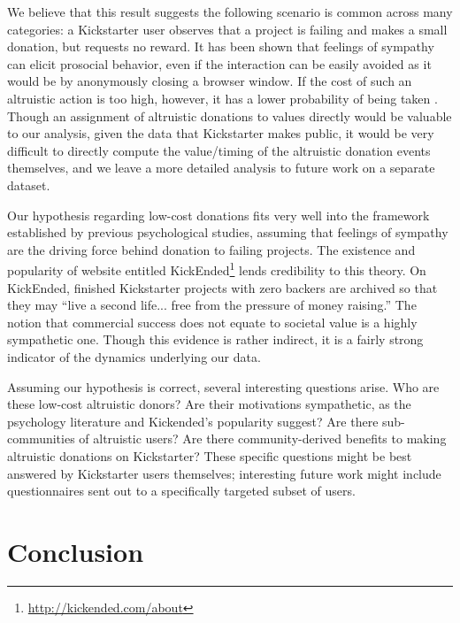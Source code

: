 \documentclass[letterpaper]{article}
\begin{document}
We believe that this result suggests the following scenario is common across many categories: a Kickstarter user observes that a project is failing and makes a small donation, but requests no reward. It has been shown that feelings of sympathy can elicit prosocial behavior, even if the interaction can be easily avoided \cite{eisenberg1989relation} as it would be by anonymously closing a browser window. If the cost of such an altruistic action is too high, however, it has a lower probability of being taken \cite{batson1983influence}. Though an assignment of altruistic donations to values directly would be valuable to our analysis, given the data that Kickstarter makes public, it would be very difficult to directly compute the value/timing of the altruistic donation events themselves, and we leave a more detailed analysis to future work on a separate dataset.

Our hypothesis regarding low-cost donations fits very well into the framework established by previous psychological studies, assuming that feelings of sympathy are the driving force behind donation to failing projects. The existence and popularity of website entitled KickEnded\footnote{\url{http://kickended.com/about}} lends credibility to this theory. On KickEnded, finished Kickstarter projects with zero backers are archived so that they may ``live a second life... free from the pressure of money raising.'' The notion that commercial success does not equate to societal value is a highly sympathetic one. Though this evidence is rather indirect, it is a fairly strong indicator of the dynamics underlying our data.

Assuming our hypothesis is correct, several interesting questions arise. Who are these low-cost altruistic donors? Are their motivations sympathetic, as the psychology literature and Kickended's popularity suggest? Are there sub-communities of altruistic users? Are there community-derived benefits to making altruistic donations on Kickstarter? These specific questions might be best answered by Kickstarter users themselves; interesting future work might include questionnaires sent out to a specifically targeted subset of users.

\section{Conclusion}
\end{document}
